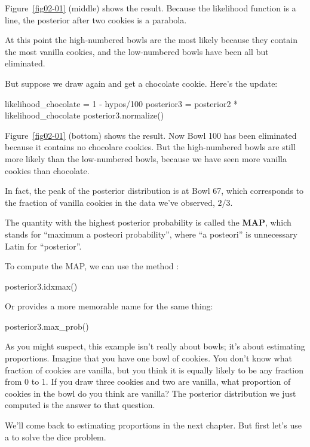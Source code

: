 \documentclass[12pt]{book}
\theoremstyle{exercise}
\begin{document}
Figure~\ref{fig02-01} (middle) shows the result.
Because the likelihood function is a line, the posterior after two cookies is a parabola.

At this point the high-numbered bowls are the most likely because they contain the most vanilla cookies, and the low-numbered bowls have been all but eliminated.

But suppose we draw again and get a chocolate cookie.
Here's the update:

\begin{code}
likelihood_chocolate = 1 - hypos/100
posterior3 = posterior2 * likelihood_chocolate
posterior3.normalize()
\end{code}

Figure~\ref{fig02-01} (bottom) shows the result.
Now Bowl 100 has been eliminated because it contains no chocolare cookies.
But the high-numbered bowls are still more likely than the low-numbered bowls, because we have seen more vanilla cookies than chocolate.

In fact, the peak of the posterior distribution is at Bowl 67, which corresponds to the fraction of vanilla cookies in the data we've observed, $2/3$.

The quantity with the highest posterior probability is called the {\bf MAP}, which stands for ``maximum a posteori probability'', where ``a posteori'' is unnecessary Latin for ``posterior''.

To compute the MAP, we can use the  method :

\begin{code}
posterior3.idxmax()
\end{code}

Or  provides a more memorable name for the same thing:

\begin{code}
 posterior3.max_prob()
\end{code}

As you might suspect, this example isn't really about bowls; it's about estimating proportions.
Imagine that you have one bowl of cookies.
You don't know what fraction of cookies are vanilla, but you think it is equally likely to be any fraction from 0 to 1.
If you draw three cookies and two are vanilla, what proportion of cookies in the bowl do you think are vanilla?
The posterior distribution we just computed is the answer to that question.

We'll come back to estimating proportions in the next chapter.
But first let's use a  to solve the dice problem.
\end{document}
